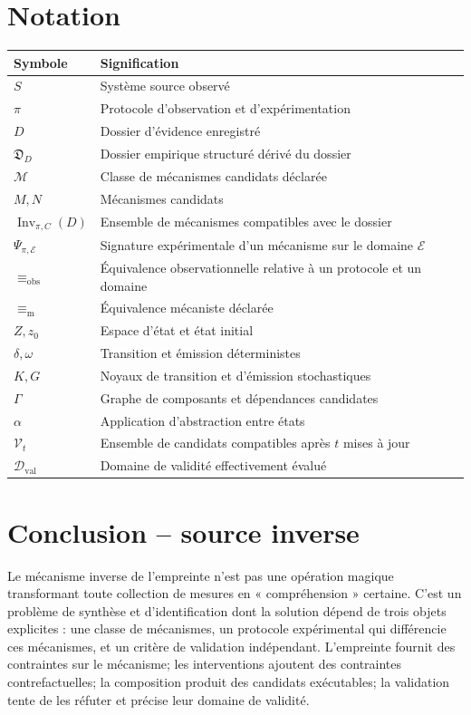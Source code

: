 \documentclass[11pt,oneside]{book}
\theoremstyle{definition}
\theoremstyle{remark}
\newcommand{\Mcal}{\mathcal M}
\newcommand{\1}{\mathbf 1}
\newcommand{\Inv}{\operatorname{Inv}}
\newcommand{\MechEq}{\equiv_{\mathrm m}}
\newcommand{\ObsEq}{\equiv_{\mathrm{obs}}}
\begin{document}
\section*{Notation}
\begin{longtable}{p{}p{}}
\toprule
\textbf{Symbole} & \textbf{Signification}\\
\midrule
$S$ & Système source observé\\
$\pi$ & Protocole d'observation et d'expérimentation\\
$D$ & Dossier d'évidence enregistré\\
$\mathfrak D_D$ & Dossier empirique structuré dérivé du dossier\\
$\Mcal$ & Classe de mécanismes candidats déclarée\\
$M,N$ & Mécanismes candidats\\
$\Inv_{\pi,C}(D)$ & Ensemble de mécanismes compatibles avec le dossier\\
$\Psi_{\pi,\mathcal E}$ & Signature expérimentale d'un mécanisme sur le domaine $\mathcal E$\\
$\ObsEq$ & Équivalence observationnelle relative à un protocole et un domaine\\
$\MechEq$ & Équivalence mécaniste déclarée\\
$Z,z_0$ & Espace d'état et état initial\\
$\delta,\omega$ & Transition et émission déterministes\\
$K,G$ & Noyaux de transition et d'émission stochastiques\\
$\Gamma$ & Graphe de composants et dépendances candidates\\
$\alpha$ & Application d'abstraction entre états\\
$\mathcal V_t$ & Ensemble de candidats compatibles après $t$ mises à jour\\
$\mathcal D_{\mathrm{val}}$ & Domaine de validité effectivement évalué\\
\bottomrule
\end{longtable}

\section*{Conclusion -- source inverse}
Le mécanisme inverse de l'empreinte n'est pas une opération magique transformant toute collection de mesures en « compréhension » certaine. C'est un problème de synthèse et d'identification dont la solution dépend de trois objets explicites : une classe de mécanismes, un protocole expérimental qui différencie ces mécanismes, et un critère de validation indépendant. L'empreinte fournit des contraintes sur le mécanisme; les interventions ajoutent des contraintes contrefactuelles; la composition produit des candidats exécutables; la validation tente de les réfuter et précise leur domaine de validité.
\end{document}
